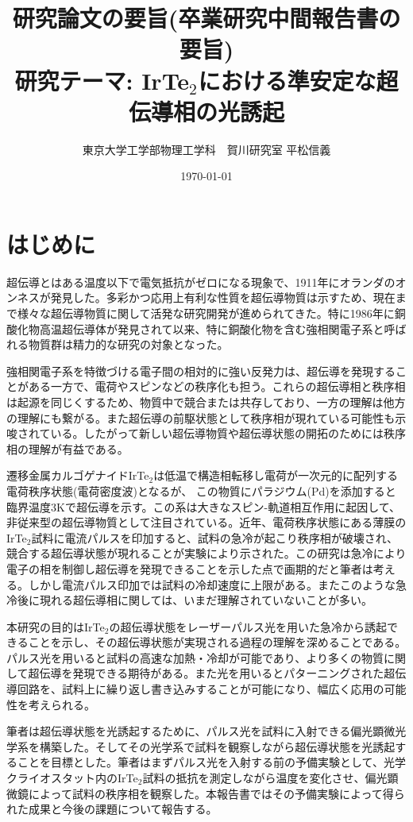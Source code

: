\documentclass[11pt,a4paper]{jsarticle}
\title{研究論文の要旨(卒業研究中間報告書の要旨)\\研究テーマ: IrTe$_2$における準安定な超伝導相の光誘起}
\author{東京大学工学部物理工学科　賀川研究室 平松信義}
\date{\today}
\begin{document}
\maketitle
\thispagestyle{mypagestyle}


\section{はじめに}
超伝導とはある温度以下で電気抵抗がゼロになる現象で、1911年にオランダのオンネスが発見した。多彩かつ応用上有利な性質を超伝導物質は示すため、現在まで様々な超伝導物質に関して活発な研究開発が進められてきた。特に1986年に銅酸化物高温超伝導体が発見されて以来、特に銅酸化物を含む強相関電子系と呼ばれる物質群は精力的な研究の対象となった。

強相関電子系を特徴づける電子間の相対的に強い反発力は、超伝導を発現することがある一方で、電荷やスピンなどの秩序化も担う。これらの超伝導相と秩序相は起源を同じくするため、物質中で競合または共存\cite{Fausti,2D_SC}しており、一方の理解は他方の理解にも繋がる。また超伝導の前駆状態として秩序相が現れている可能性も示唆されている\cite{Valla1914}。したがって新しい超伝導物質や超伝導状態の開拓のためには秩序相の理解が有益である。

遷移金属カルゴゲナイドIrTe$_2$は低温で構造相転移し電荷が一次元的に配列する電荷秩序状態(電荷密度波)となるが、
この物質にパラジウム(Pd)を添加すると臨界温度3Kで超伝導を示す\cite{IrTe2Pd_SC}。この系は大きなスピン-軌道相互作用に起因して、非従来型の超伝導物質として注目されている。近年、電荷秩序状態にある薄膜のIrTe$_2$試料に電流パルスを印加すると、試料の急冷が起こり秩序相が破壊され、競合する超伝導状態が現れることが実験により示された\cite{SC_IrTe2}。この研究は急冷により電子の相を制御し超伝導を発現できることを示した点で画期的だと筆者は考える。しかし電流パルス印加では試料の冷却速度に上限がある。またこのような急冷後に現れる超伝導相に関しては、いまだ理解されていないことが多い。

本研究の目的はIrTe$_2$の超伝導状態をレーザーパルス光を用いた急冷から誘起できることを示し、その超伝導状態が実現される過程の理解を深めることである。パルス光を用いると試料の高速な加熱・冷却が可能であり、より多くの物質に関して超伝導を発現できる期待がある。また光を用いるとパターニングされた超伝導回路を、試料上に繰り返し書き込みすることが可能になり、幅広く応用の可能性を考えられる。

筆者は超伝導状態を光誘起するために、パルス光を試料に入射できる偏光顕微光学系を構築した。そしてその光学系で試料を観察しながら超伝導状態を光誘起することを目標とした。筆者はまずパルス光を入射する前の予備実験として、光学クライオスタット内のIrTe$_2$試料の抵抗を測定しながら温度を変化させ、偏光顕微鏡によって試料の秩序相を観察した。本報告書ではその予備実験によって得られた成果と今後の課題について報告する。
\end{document}
